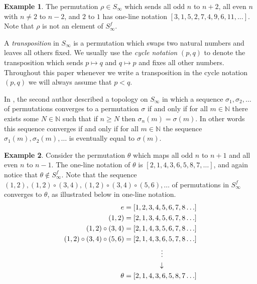 \documentclass[oneside,11pt,reqno]{amsart}
\newcommand{\nn}{\ensuremath{\mathbb{N}}}
\theoremstyle{definition}
\newtheorem{example}{Example}
\newtheorem{proof techniques}{Proof Techniques}
\begin{document}
\begin{example}\label{ex: first perm}
    The permutation $\rho \in S_\infty$ which sends all odd $n$ to $n + 2$, all even $n$ with $n \neq 2$ to $n - 2$, and $2$ to $1$ has one-line notation $[3, 1, 5, 2, 7, 4, 9, 6, 11 , \ldots ]$. Note that $\rho$ is not an element of $S_\infty^f$. 
\end{example}

A \emph{transposition} in $S_\infty$ is a permutation which swaps two natural numbers and leaves all others fixed. We usually use the \emph{cycle notation} $(p , q)$ to denote the transposition which sends $p \mapsto q$ and $q \mapsto p$ and fixes all other numbers. Throughout this paper whenever we write a transposition in the cycle notation $(p , q)$ we will always assume that $p < q$.

In \cite[Section 9]{gallup2021well}, the second author described a topology on $S_\infty$ in which a sequence $\sigma_1, \sigma_2, \ldots$ of permutations converges to a permutation $\sigma$ if and only if for all $m \in \nn$ there exists some $N \in \nn$ such that if $n \geq N$ then $\sigma_n(m) = \sigma(m)$. In other words this sequence converges if and only if for all $m \in \nn$ the sequence $\sigma_1(m), \sigma_2(m), \ldots$ is eventually equal to $\sigma(m)$. 

\begin{example}\label{ex: two infinite permutations}
    Consider the permutation $\theta$ which maps all odd $n$ to $n + 1$ and all even $n$ to $n - 1$. The one-line notation of $\theta$ is $[2,1,4,3,6,5,8,7, \ldots]$, and again notice that $\theta \notin S_\infty^f$. Note that the sequence $(1 , 2), (1 , 2) \circ (3 , 4) , (1 , 2) \circ (3, 4) \circ (5 , 6) , \ldots$ of permutations in $S_\infty^f$ converges to $\theta$, as illustrated below in one-line notation. 
    \begin{align*}
    e &=[1,2,3,4,5,6,7,8 \ldots]
    \\ (1,2) &= [2,1,3,4,5,6,7,8 \ldots]
    \\(1,2)\circ (3,4)&= [2,1,4,3,5,6,7,8 \ldots]
    \\(1,2)\circ (3,4) \circ (5,6) &=[2,1,4,3,6,5,7,8 \ldots ]
    \\& \hspace{18.5 mm} \vdots
    \\& \hspace{17 mm} \downarrow
    \\\hspace{1 mm} \theta & = [2,1,4,3,6,5,8,7 \ldots]
    \end{align*}
\end{example}
\end{document}
